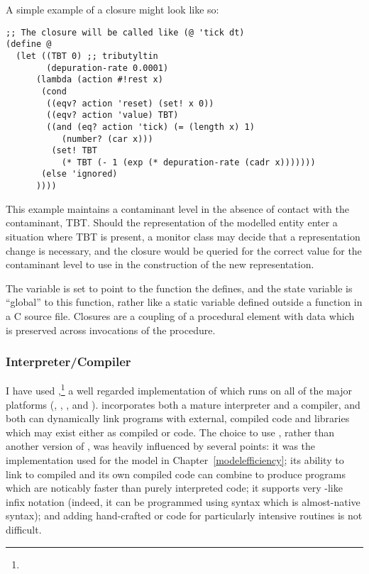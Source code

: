 A simple example of a closure might look like so:
\begin{verbatim}
;; The closure will be called like (@ 'tick dt) 
(define @
  (let ((TBT 0) ;; tributyltin
        (depuration-rate 0.0001) 
      (lambda (action #!rest x)
       (cond
        ((eqv? action 'reset) (set! x 0))
        ((eqv? action 'value) TBT)
        ((and (eq? action 'tick) (= (length x) 1) 
           (number? (car x)))
         (set! TBT 
           (* TBT (- 1 (exp (* depuration-rate (cadr x)))))))
       (else 'ignored)
      ))))

\end{verbatim}
This example maintains a contaminant level in the absence of contact
with the contaminant, TBT.  Should the representation of the
modelled entity enter a situation where TBT is present, a monitor
class may decide that a representation change is necessary, and the
closure would be queried for the correct value for the contaminant
level to use in the construction of the new representation.

The variable  is set to point to the function the
 defines, and the state variable  is
``global'' to this function, rather like a static variable defined
outside a function in a C source file. Closures are a
coupling of a procedural element with data which is preserved across
invocations of the procedure.

\subsubsection{Interpreter/Compiler}
I have used
\GambitC,\footnote{} a well
regarded implementation of \Scheme which runs on all of the major
platforms (\Linux, \Unix, \OSX, \Android and \Windows). \Gambit
incorporates both a mature \Scheme interpreter and a compiler, and
both can dynamically link programs with external, compiled code and
libraries which may exist either as compiled \CC or \Scheme code.  The
choice to use \Gambit, rather than another version of \Scheme,
was heavily influenced by several points: it was the implementation
used for the model in Chapter~\ref{modelefficiency}; its ability to
link to compiled \CC and its own compiled code can combine to produce
programs which are noticably faster than purely interpreted code; it
supports very \CC-like infix notation (indeed, it can be programmed
using syntax which is almost-native \CC syntax); and adding
hand-crafted \CC or \Cpp code for particularly intensive routines is
not difficult.

